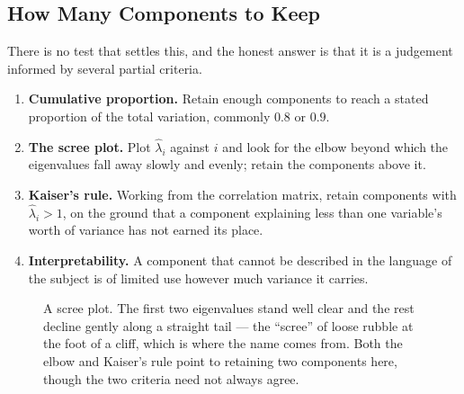 \documentclass[11pt,a4paper]{article}
\theoremstyle{definition}
\begin{document}
\subsection{How Many Components to Keep}

There is no test that settles this, and the honest answer is that it is a
judgement informed by several partial criteria.

\begin{enumerate}
\item[(i)] \textbf{Cumulative proportion.} Retain enough components to reach a
stated proportion of the total variation, commonly $0.8$ or $0.9$.
\item[(ii)] \textbf{The scree plot.} Plot $\widehat{\lambda}_i$ against $i$ and
look for the elbow beyond which the eigenvalues fall away slowly and evenly;
retain the components above it.
\item[(iii)] \textbf{Kaiser's rule.} Working from the correlation matrix, retain
components with $\widehat{\lambda}_i>1$, on the ground that a component
explaining less than one variable's worth of variance has not earned its place.
\item[(iv)] \textbf{Interpretability.} A component that cannot be described in
the language of the subject is of limited use however much variance it carries.
\end{enumerate}

\begin{figure}[H]
\centering
{}
\caption{A scree plot. The first two eigenvalues stand well clear and the rest
decline gently along a straight tail --- the ``scree'' of loose rubble at the
foot of a cliff, which is where the name comes from. Both the elbow and
Kaiser's rule point to retaining two components here, though the two criteria
need not always agree.}
\label{fig:scree}
\end{figure}
\end{document}

